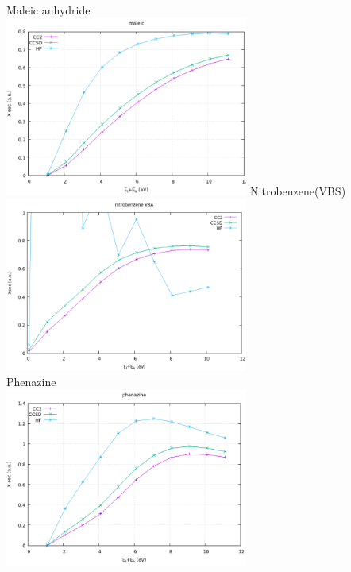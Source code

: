 \vfill
Maleic anhydride\\
\includegraphics[width=0.6\textwidth]{chapters/appendix/image/maleic.png}
\vfill
Nitrobenzene(VBS)\\
\includegraphics[width=0.6\textwidth]{chapters/appendix/image/nitrobenzeneVBA.png}\\
\vfill
Phenazine\\
\includegraphics[width=0.6\textwidth]{chapters/appendix/image/phenazine.png}\\
\vfill




\cleardoublepage

